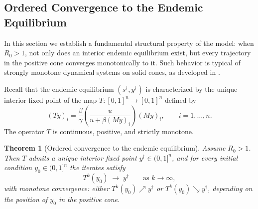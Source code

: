 \documentclass[final,3p,times,twocolumn]{elsarticle}
\newtheorem{theorem}{Theorem}
\begin{document}
\subsection{Ordered Convergence to the Endemic Equilibrium}

In this section we establish a fundamental structural property of the model:
when $R_0>1$, not only does an interior endemic equilibrium exist, but every
trajectory in the positive cone converges monotonically to it.  
Such behavior is typical of strongly monotone dynamical systems on solid cones,
as developed in \cite{Hirsch1985,Smith1995}.

Recall that the endemic equilibrium $(s^\dagger,y^\dagger)$ is characterized
by the unique interior fixed point of the map $T:[0,1]^n \to [0,1]^n$ defined by
\[
(Ty)_i 
= \frac{\beta}{\gamma}
\left(
    \frac{u}{u+\beta (My)_i}
\right)
(My)_i,
\qquad i=1,\dots,n.
\]
The operator $T$ is continuous, positive, and strictly monotone.

\begin{theorem}[Ordered convergence to the endemic equilibrium]
\label{thm:ordercontraction}
Assume $R_0>1$. Then $T$ admits a unique interior fixed point
$y^\dagger \in (0,1]^n$, and for every initial condition
$y_0 \in (0,1]^n$ the iterates satisfy
\[
T^k(y_0)\;\longrightarrow\; y^\dagger
\qquad\text{as } k\to\infty,
\]
with monotone convergence: either $T^k(y_0)\nearrow y^\dagger$ or
$T^k(y_0)\searrow y^\dagger$, depending on the position of $y_0$ in the
positive cone.
\end{theorem}
\end{document}
